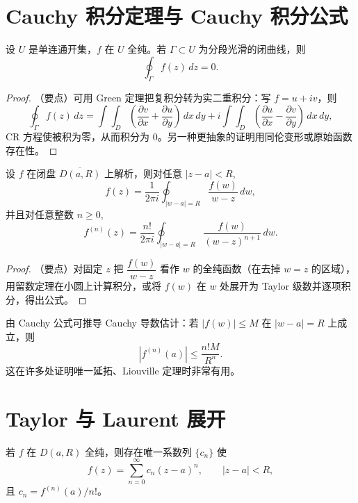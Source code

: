 \documentclass[lang=cn,10pt]{elegantbook}
\begin{document}
	\section{Cauchy 积分定理与 Cauchy 积分公式}
	
	\begin{definition}
		设 \(U\) 是单连通开集，\(f\) 在 \(U\) 全纯。若 \(\Gamma\subset U\) 为分段光滑的闭曲线，则
		\[
		\oint_\Gamma f(z)\,dz=0.
		\]
	\end{definition}
	
	\begin{proof}
		（要点）可用 Green 定理把复积分转为实二重积分：写 \(f=u+iv\)，则
		\[
		\oint_\Gamma f(z)\,dz = \int\!\!\int_D\left(\frac{\partial v}{\partial x}+\frac{\partial u}{\partial y}\right)\,dx\,dy + i\int\!\!\int_D\left(\frac{\partial u}{\partial x}-\frac{\partial v}{\partial y}\right)\,dx\,dy,
		\]
		CR 方程使被积为零，从而积分为 0。另一种更抽象的证明用同伦变形或原始函数存在性。
	\end{proof}
	
	\begin{definition}
		设 \(f\) 在闭盘 \(\overline{D(a,R)}\) 上解析，则对任意 \(|z-a|<R\),
		\[
		f(z)=\frac{1}{2\pi i}\oint_{|w-a|=R}\frac{f(w)}{w-z}\,dw,
		\]
		并且对任意整数 \(n\ge0\),
		\[
		f^{(n)}(z)=\frac{n!}{2\pi i}\oint_{|w-a|=R}\frac{f(w)}{(w-z)^{n+1}}\,dw.
		\]
	\end{definition}
	
	\begin{proof}
		（要点）对固定 \(z\) 把 \(\dfrac{f(w)}{w-z}\) 看作 \(w\) 的全纯函数（在去掉 \(w=z\) 的区域），用留数定理在小圆上计算积分，或将 \(f(w)\) 在 \(w\) 处展开为 Taylor 级数并逐项积分，得出公式。
	\end{proof}
	
	\begin{example}
		由 Cauchy 公式可推导 Cauchy 导数估计：若 \(|f(w)|\le M\) 在 \(|w-a|=R\) 上成立，则
		\[
		|f^{(n)}(a)|\le \frac{n! M}{R^n}.
		\]
		这在许多处证明唯一延拓、Liouville 定理时非常有用。
	\end{example}
	
	\section{Taylor 与 Laurent 展开}
	
	\begin{definition}[Taylor 展开（局部）]
		若 \(f\) 在 \(D(a,R)\) 全纯，则存在唯一系数列 \(\{c_n\}\) 使
		\[
		f(z)=\sum_{n=0}^\infty c_n (z-a)^n,\qquad |z-a|<R,
		\]
		且 \(c_n=f^{(n)}(a)/n!\)。
	\end{definition}
	
\end{document}
